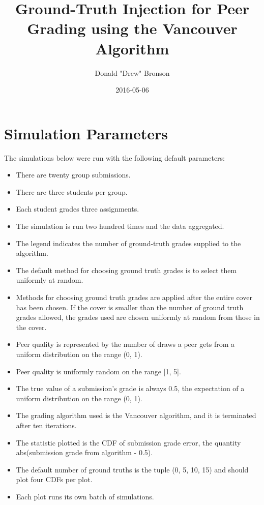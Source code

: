 \documentclass{article}
\title{Ground-Truth Injection for Peer Grading using the Vancouver Algorithm}
\author{Donald "Drew" Bronson}
\date{2016-05-06}
\begin{document}
	\maketitle
	

	\section{Simulation Parameters}
	The simulations below were run with the following default parameters:
	\begin{itemize}
		\item There are twenty group submissions.
		\item There are three students per group.
		\item Each student grades three assignments.
		\item The simulation is run two hundred times and the data aggregated.
		\item The legend indicates the number of ground-truth grades supplied to the algorithm.
		\item The default method for choosing ground truth grades is to select them uniformly at random.
		\item Methods for choosing ground truth grades are applied after the entire cover has been chosen. If the cover is smaller than the number of ground truth grades allowed, the grades used are chosen uniformly at random from those in the cover.
		\item Peer quality is represented by the number of draws a peer gets from a uniform distribution on the range (0, 1).
		\item Peer quality is uniformly random on the range [1, 5].
		\item The true value of a submission's grade is always 0.5, the expectation of a uniform distribution on the range (0, 1).
		\item The grading algorithm used is the Vancouver algorithm, and it is terminated after ten iterations.
		\item The statistic plotted is the CDF of submission grade error, the quantity abs(submission grade from algorithm - 0.5).
		\item The default number of ground truths is the tuple (0, 5, 10, 15) and should plot four CDFs per plot.
		\item Each plot runs its own batch of simulations.
	\end{itemize}
	
\end{document}
